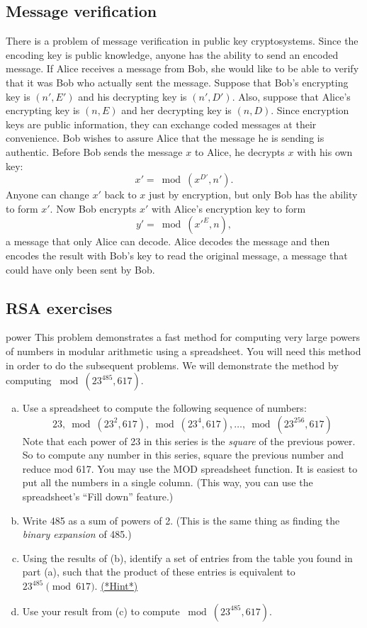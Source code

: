 \subsection{Message verification}\label{crypt:verify}
 
 
There is a problem of message verification in public key
cryptosystems. Since the encoding key is public knowledge, anyone has
the ability to send an encoded message.  If Alice receives a message
from Bob, she would like to be able to verify that it was Bob who
actually sent the message. Suppose that Bob's encrypting key is $(n',
E')$ and his decrypting key is $(n', D')$.  Also, suppose that Alice's
encrypting key is $(n, E)$ and her decrypting key is $(n, D)$.  Since
encryption keys are public information, they can exchange coded
messages at their convenience.  Bob wishes to assure Alice that the
message he is sending is authentic. Before Bob sends the message $x$
to Alice, he decrypts  $x$ with his own key:
$$
x' =  \bmod(x ^{D'}, n').
$$
Anyone can change $x'$ back to $x$ just by encryption, but only Bob
has the ability to form $x'$. Now Bob encrypts $x'$ with Alice's
encryption key to form 
$$
y' = \bmod({x'}^E,   n),
$$
a message that only Alice can decode.  Alice decodes the message and
then encodes the result with Bob's key to read the original message, a
message that could have only been sent by Bob.
 

\subsection{RSA exercises\quad
{}}
 

\begin{exercise}{power}
This problem demonstrates a fast method for computing very large powers of numbers in modular arithmetic using a spreadsheet.  You will need this method in order to do the subsequent problems. We will demonstrate the method by computing $\bmod(23^{485} ,617)$.
\begin{enumerate}[(a)]
\item
Use a spreadsheet to compute the following sequence of numbers:
\[ 23, \bmod(23^2 ,617),\bmod(23^4 ,617),\ldots,\bmod(23^{256} ,617) \]
Note that each power of 23 in this series is the  \emph{square} of the previous power.  So to compute any number in this series, square the previous number and reduce mod 617.  You may use the MOD spreadsheet function.  It is easiest to put all the numbers in a single column. (This way, you can use the spreadsheet's ``Fill down'' feature.)
\item  Write 485 as a sum of powers of 2.  (This is the same thing as finding the \emph{binary expansion} of 485.)
\item Using the results of (b), identify a set of entries from the table you found in part (a), such that the product of these entries is equivalent to $23^{485}  \pmod{617}$.
\hyperref[sec:crypt:hints]{(*Hint*)}
\item 
Use your result from (c) to compute $\bmod(23^{485} ,617)$.
\end{enumerate}
\end{exercise}

